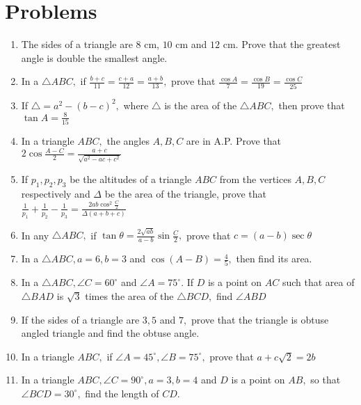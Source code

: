 \section{Problems}
\begin{enumerate}
\item The sides of a triangle are $8$ cm, $10$ cm and $12$ cm. Prove that the greatest angle is double the smallest
   angle.

\item In a $\triangle ABC,$ if $\frac{b + c}{11} = \frac{c + a}{12} = \frac{a + b}{13},$ prove that $\frac{\cos
   A}{7} = \frac{\cos B}{19} = \frac{\cos C}{25}$

\item If $\triangle = a^2 - (b - c)^2,$ where $\triangle$ is the area of the $\triangle ABC,$ then prove that
   $\tan A = \frac{8}{15}$

\item In a triangle $ABC,$ the angles $A, B, C$ are in A.P. Prove that $2\cos\frac{A - C}{2} = \frac{a +
   c}{\sqrt{a^2 - ac + c^2}}$

\item If $p_1, p_2, p_3$ be the altitudes of a triangle $ABC$ from the vertices $A, B, C$ respectively and
   $\Delta$ be the area of the triangle, prove that $\frac{1}{p_1} + \frac{1}{p_2} - \frac{1}{p_3} =
   \frac{2ab\cos^2\frac{C}{2}}{\Delta(a + b + c)}$

\item In any $\triangle ABC,$ if $\tan\theta = \frac{2\sqrt{ab}}{a - b}\sin\frac{C}{2},$ prove that $c = (a -
   b)\sec\theta$

\item In a $\triangle ABC, a=6, b = 3$ and $\cos(A - B) = \frac{4}{5},$ then find its area.

\item In a $\triangle ABC, \angle C=60^\circ$ and $\angle A=75^\circ.$ If $D$ is a point on $AC$ such that
   area of $\triangle BAD$ is $\sqrt{3}$ times the area of the $\triangle BCD,$ find $\angle ABD$

\item If the sides of a triangle are $3, 5$ and $7,$ prove that the triangle is obtuse angled triangle and find the obtuse
   angle.

\item In a triangle $ABC,$ if $\angle A = 45^\circ, \angle B = 75^\circ,$ prove that $a + c\sqrt{2} = 2b$

\item In a triangle $ABC, \angle C = 90^\circ, a = 3, b =4$ and $D$ is a point on $AB,$ so that $\angle
    BCD=30^\circ,$ find the length of $CD.$


\end{enumerate}
